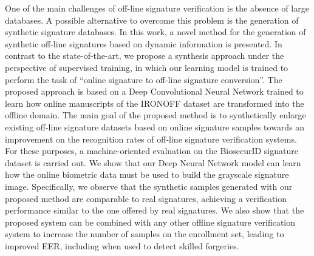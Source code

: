 \setlength{\absparsep}{18pt} %
\begin{resumo}
One of the main challenges of off-line signature verification is the absence of large databases. A possible alternative to overcome this problem is the generation of synthetic signature databases. In this work, a novel method for the generation of synthetic off-line signatures based on dynamic information is presented. In contrast to the state-of-the-art, we propose a synthesis approach under the perspective of supervised training, in which our learning model is trained to perform the task of ``online signature to off-line signature conversion''. The proposed approach is based on a Deep Convolutional Neural Network trained to learn how online manuscripts of the IRONOFF dataset are transformed into the offline domain. The main goal of the proposed method is to synthetically enlarge existing off-line signature datasets based on online signature samples towards an improvement on the recognition rates of off-line signature verification systems. For these purposes, a machine-oriented evaluation on the BiosecurID signature dataset is carried out. We show that our Deep Neural Network model can learn how the online biometric data must be used to build the grayscale signature image. Specifically, we observe that the synthetic samples generated with our proposed method are comparable to real signatures, achieving a verification performance similar to the one offered by real signatures. We also show that the proposed system can be combined with any other offline signature verification system to increase the number of samples on the enrollment set, leading to improved EER, including when used to detect skilled forgeries.
\end{resumo}

